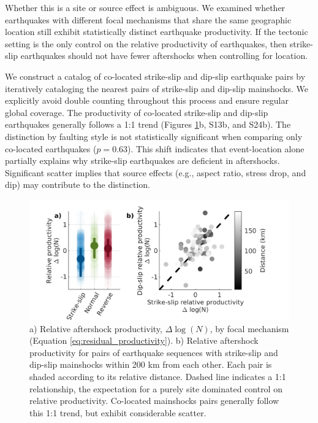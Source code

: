 \documentclass[draft, jgrga]{agujournal2018}
\begin{document}
    Whether this is a site or source effect is ambiguous. We examined whether earthquakes with different focal mechanisms that share the same geographic location still exhibit statistically distinct earthquake productivity. If the tectonic setting is the only control on the relative productivity of earthquakes, then strike-slip earthquakes should not have fewer aftershocks when controlling for location. 
    
    We construct a catalog of co-located strike-slip and dip-slip earthquake pairs by iteratively cataloging the nearest pairs of strike-slip and dip-slip mainshocks. We explicitly avoid double counting throughout this process and ensure regular global coverage. The productivity of co-located strike-slip and dip-slip earthquakes generally follows a 1:1 trend (Figures \ref{fig:coloc}b, S13b, and S24b). The distinction by faulting style is not statistically significant when comparing only co-located earthquakes ($p = 0.63$). This shift indicates that event-location alone partially explains why strike-slip earthquakes are deficient in aftershocks. Significant scatter implies that source effects (e.g., aspect ratio, stress drop, and dip) may contribute to the distinction.
    
    \begin{figure}
        \centering
        \includegraphics{figures/fmspairs.png}
        \caption{a) Relative aftershock productivity, $\Delta \log(N)$, by focal mechanism (Equation \ref{eq:residual_productivity}). b) Relative aftershock productivity for pairs of earthquake sequences with strike-slip and dip-slip mainshocks within 200 km from each other. Each pair is shaded according to its relative distance. Dashed line indicates a 1:1 relationship, the expectation for a purely site dominated control on relative productivity. Co-located mainshocks pairs generally follow this 1:1 trend, but exhibit considerable scatter.}
        \label{fig:coloc}
    \end{figure}
        
\end{document}
